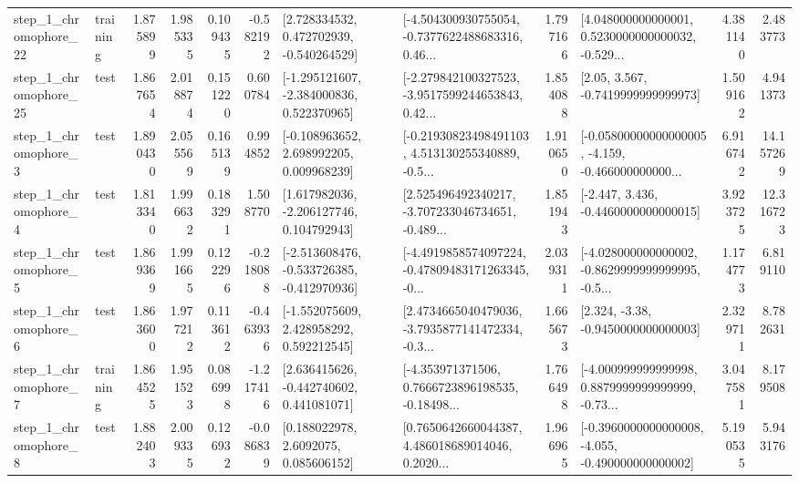 \begin{tabular}{llrrrrllrlrr}
    step\_1\_chromophore\_22 &  training &      1.875899 &    1.985335 &      0.109435 & -0.582192 &    [2.728334532, 0.472702939, -0.540264529] &  [-4.504300930755054, -0.7377622488683316, 0.46... &       1.797166 &  [4.048000000000001, 0.5230000000000032, -0.529... &            4.381140 &          2.483773 \\
    step\_1\_chromophore\_25 &      test &      1.867654 &    2.018874 &      0.151220 &  0.600784 &   [-1.295121607, -2.384000836, 0.522370965] &  [-2.279842100327523, -3.9517599244653843, 0.42... &       1.854088 &                 [2.05, 3.567, -0.7419999999999973] &            1.509162 &          4.941373 \\
     step\_1\_chromophore\_3 &      test &      1.890430 &    2.055569 &      0.165139 &  0.994852 &    [-0.108963652, 2.698992205, 0.009968239] &  [-0.21930823498491103, 4.513130255340889, -0.5... &       1.910650 &  [-0.05800000000000005, -4.159, -0.466000000000... &            6.916742 &         14.157269 \\
     step\_1\_chromophore\_4 &      test &      1.813340 &    1.996632 &      0.183291 &  1.508770 &    [1.617982036, -2.206127746, 0.104792943] &  [2.525496492340217, -3.707233046734651, -0.489... &       1.851943 &               [-2.447, 3.436, -0.4460000000000015] &            3.923725 &         12.316723 \\
     step\_1\_chromophore\_5 &      test &      1.869369 &    1.991665 &      0.122296 & -0.218088 &  [-2.513608476, -0.533726385, -0.412970936] &  [-4.4919858574097224, -0.47809483171263345, -0... &       2.039311 &  [-4.028000000000002, -0.8629999999999995, -0.5... &            1.174773 &          6.819110 \\
     step\_1\_chromophore\_6 &      test &      1.863600 &    1.977212 &      0.113612 & -0.463936 &    [-1.552075609, 2.428958292, 0.592212545] &  [2.4734665040479036, -3.7935877141472334, -0.3... &       1.665673 &                [2.324, -3.38, -0.9450000000000003] &            2.329711 &          8.782631 \\
     step\_1\_chromophore\_7 &  training &      1.864525 &    1.951523 &      0.086998 & -1.217416 &    [2.636415626, -0.442740602, 0.441081071] &  [-4.353971371506, 0.7666723896198535, -0.18498... &       1.766498 &  [-4.000999999999998, 0.8879999999999999, -0.73... &            3.047581 &          8.179508 \\
     step\_1\_chromophore\_8 &      test &      1.882403 &    2.009335 &      0.126932 & -0.086839 &       [0.188022978, 2.6092075, 0.085606152] &  [0.7650642660044387, 4.486018689014046, 0.2020... &       1.966965 &  [-0.3960000000000008, -4.055, -0.490000000000002] &            5.190535 &          5.943176 \\

\end{tabular}
